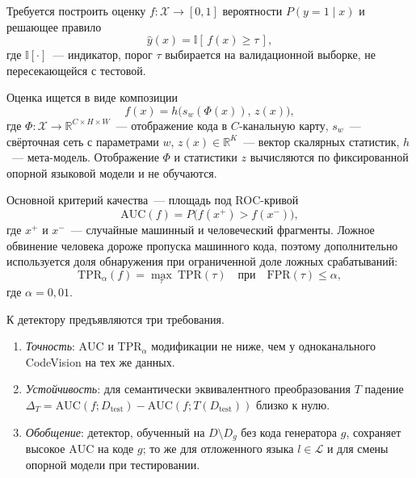 \documentclass{misisarticle}
\begin{document}
Требуется построить оценку $f\colon \mathcal{X} \to [0, 1]$ вероятности $P(y = 1 \mid x)$ и решающее правило
\begin{equation}
  \hat{y}(x) = \mathbb{I}\left[\, f(x) \ge \tau \,\right],
  \label{eq:rule}
\end{equation}
где $\mathbb{I}[\cdot]$~--- индикатор, порог $\tau$ выбирается на валидационной выборке, не пересекающейся с тестовой.

Оценка ищется в виде композиции
\begin{equation}
  f(x) = h\bigl(s_w(\Phi(x)),\, z(x)\bigr),
  \label{eq:composition}
\end{equation}
где $\Phi\colon \mathcal{X} \to \mathbb{R}^{C \times H \times W}$~--- отображение кода в $C$-канальную карту, $s_w$~--- свёрточная сеть с параметрами $w$, $z(x) \in \mathbb{R}^{K}$~--- вектор скалярных статистик, $h$~--- мета-модель. Отображение $\Phi$ и статистики $z$ вычисляются по фиксированной опорной языковой модели и не обучаются.

Основной критерий качества~--- площадь под ROC-кривой
\begin{equation}
  \mathrm{AUC}(f) = P\bigl(f(x^{+}) > f(x^{-})\bigr),
  \label{eq:auc}
\end{equation}
где $x^{+}$ и $x^{-}$~--- случайные машинный и человеческий фрагменты. Ложное обвинение человека дороже пропуска машинного кода, поэтому дополнительно используется доля обнаружения при ограниченной доле ложных срабатываний:
\begin{equation}
  \mathrm{TPR}_{\alpha}(f) = \max_{\tau}\ \mathrm{TPR}(\tau) \quad \text{при} \quad \mathrm{FPR}(\tau) \le \alpha,
  \label{eq:tpr}
\end{equation}
где $\alpha = 0{,}01$.

К детектору предъявляются три требования.
\begin{enumerate}
  \item \textit{Точность}: $\mathrm{AUC}$ и $\mathrm{TPR}_{\alpha}$ модификации не ниже, чем у одноканального CodeVision на тех же данных.
  \item \textit{Устойчивость}: для семантически эквивалентного преобразования $T$ падение $\Delta_T = \mathrm{AUC}(f; D_{\text{test}}) - \mathrm{AUC}(f; T(D_{\text{test}}))$ близко к нулю.
  \item \textit{Обобщение}: детектор, обученный на $D \setminus D_g$ без кода генератора $g$, сохраняет высокое $\mathrm{AUC}$ на коде $g$; то же для отложенного языка $l \in \mathcal{L}$ и для смены опорной модели при тестировании.
\end{enumerate}
\end{document}
